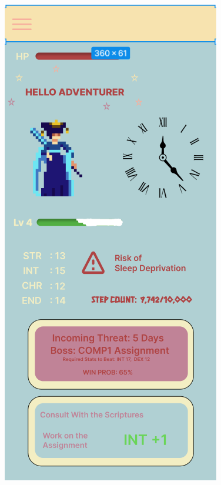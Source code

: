 \documentclass{l4proj}
\begin{document}
\begin{figure}
\centering
\begin{minipage}{.5\textwidth}
  \centering
  \includegraphics[width=.6\linewidth]{images/homepageWireFrame.png}
  \label{fig:homepage_wireframe}
\end{minipage}%
\begin{minipage}{.5\textwidth}
  \centering

\end{minipage}
\end{figure}
\end{document}
